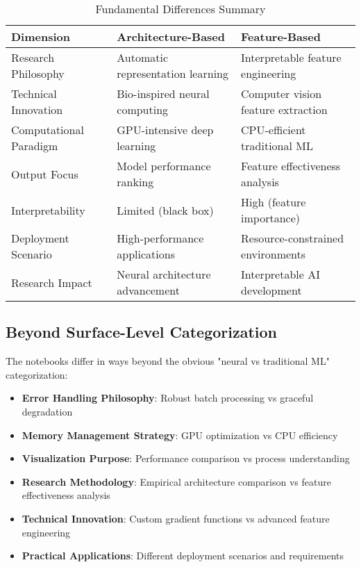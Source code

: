 \documentclass[11pt,a4paper]{article}
\begin{document}
\begin{table}[h]
\centering
\caption{Fundamental Differences Summary}
\begin{tabular}{@{}lll@{}}
\toprule
\textbf{Dimension} & \textbf{Architecture-Based} & \textbf{Feature-Based} \\
\midrule
Research Philosophy & Automatic representation learning & Interpretable feature engineering \\
Technical Innovation & Bio-inspired neural computing & Computer vision feature extraction \\
Computational Paradigm & GPU-intensive deep learning & CPU-efficient traditional ML \\
Output Focus & Model performance ranking & Feature effectiveness analysis \\
Interpretability & Limited (black box) & High (feature importance) \\
Deployment Scenario & High-performance applications & Resource-constrained environments \\
Research Impact & Neural architecture advancement & Interpretable AI development \\
\bottomrule
\end{tabular}
\end{table}

\subsection{Beyond Surface-Level Categorization}

The notebooks differ in ways beyond the obvious "neural vs traditional ML" categorization:

\begin{itemize}
    \item \textbf{Error Handling Philosophy}: Robust batch processing vs graceful degradation
    \item \textbf{Memory Management Strategy}: GPU optimization vs CPU efficiency
    \item \textbf{Visualization Purpose}: Performance comparison vs process understanding
    \item \textbf{Research Methodology}: Empirical architecture comparison vs feature effectiveness analysis
    \item \textbf{Technical Innovation}: Custom gradient functions vs advanced feature engineering
    \item \textbf{Practical Applications}: Different deployment scenarios and requirements
\end{itemize}
\end{document}
